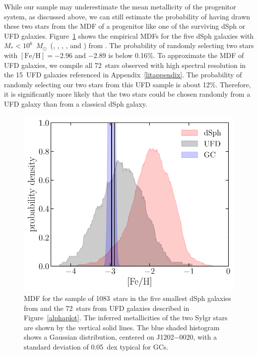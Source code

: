 \documentclass[twocolumn,tighten]{aastex62}
\newcommand{\feh}{{\mathrm{[Fe/H]}}}
\newcommand{\jtwo}{J1202$-$0020}
\newcommand{\msun}{\mbox{$M_{\odot}$}}
\begin{document}
While our sample may underestimate the mean metallicity 
of the progenitor system, as discussed above, 
we can still estimate the probability of having drawn 
these two stars from the MDF of a progenitor 
like one of the surviving dSph or UFD galaxies.
Figure~\ref{fig:mdf} shows the empirical MDFs 
for the five dSph galaxies with 
$M_{*} < 10^{6}$~\msun\
(,
,
,
, and
) from \citet{kirby10mdf}.
The probability of randomly selecting two stars with 
$\feh=-2.96$ and $-2.89$ is below 0.16\%.
To approximate the MDF of UFD galaxies, 
we compile all 72~stars observed with high spectral resolution 
in the 15~UFD galaxies referenced in Appendix~\ref{litappendix}.
The probability of randomly selecting 
our two stars from this UFD sample is about 12\%.
Therefore, it is significantly more likely 
that the two stars could be chosen randomly 
from a UFD galaxy than from a classical dSph galaxy.


\begin{figure}
\includegraphics[width=\columnwidth]{fig4.pdf}
\vspace{-6mm}
\caption{MDF for the sample of 1083~stars in the five smallest dSph galaxies from \citet{kirby10mdf} and the 72~stars from UFD galaxies described in Figure~\ref{alphaplot}. The inferred metallicities of the two Sylgr stars are shown by the vertical solid lines. The blue shaded histogram shows a Gaussian distribution, centered on \jtwo, with a standard deviation of 0.05~dex typical for GCs.}
\label{fig:mdf}
\end{figure}
\end{document}
